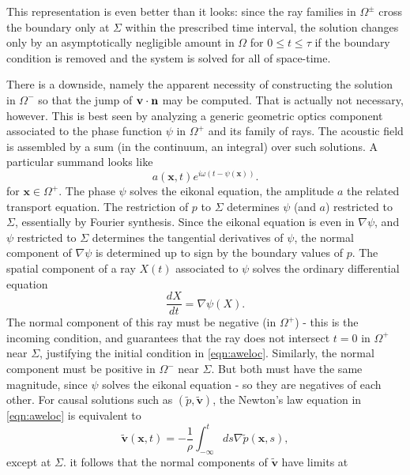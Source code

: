 \documentclass[georeport,12pt]{geophysics}
\newcommand{\bx}{\mathbf{x}}
\newcommand{\bv}{\mathbf{v}}
\begin{document}
This representation is even better than it looks: since the ray
families in $\Omega^{\pm}$ cross the boundary only at $\Sigma$ within
the prescribed time interval, the
solution changes only by an asymptotically negligible amount in
$\Omega$ for $0 \le t \le \tau$ if the boundary condition is removed
and the system is solved for all of space-time.

There is a downside, namely the apparent necessity of constructing the
solution in $\Omega^-$ so that the jump of $\bv \cdot {\bf n}$ may be
computed. That is actually not necessary, however.
This is best seen by analyzing a generic geometric optics
component associated to the phase function $\psi$ in $\Omega^+$ and its family of
rays. The acoustic field is assembled by a sum (in the continuum, an
integral) over such solutions. A particular summand looks like
\begin{equation}
  \label{eqn:go}
   a(\bx,t)e^{i\omega (t - \psi(\bx))}.
\end{equation}
for $\bx \in \Omega^+$.
The phase $\psi$ solves the eikonal equation, the amplitude $a$ the
related transport equation. The restriction of $p$
to $\Sigma$ determines $\psi$ (and $a$) restricted to $\Sigma$, essentially by
Fourier synthesis. Since the eikonal
equation is even in $\nabla \psi$,  and $\psi$ restricted to $\Sigma$
determines the tangential derivatives of $\psi$, the normal component
of $\nabla \psi$ is determined up to sign by the boundary values of
$p$. The spatial component of a ray $X(t)$ associated to $\psi$ solves
the ordinary differential equation
\begin{equation}
  \label{eqn:ray}
  \frac{dX}{dt} = \nabla \psi(X).
\end{equation}
The normal component of this ray must be negative (in
$\Omega^+$) - this is the incoming condition, and guarantees that the
ray does not intersect $t=0$ in $\Omega^+$ near $\Sigma$, justifying the initial
condition in \ref{eqn:aweloc}. Similarly, the normal component must be
positive in $\Omega^-$ near $\Sigma$. But both must have the same magnitude, since
$\psi$ solves the eikonal equation - so they are negatives of each
other. For causal solutions such as $(\tilde{p},\tilde{\bv})$, the
Newton's law equation in \ref{eqn:aweloc} is equivalent to
\begin{equation}\label{eqn:newt}
  \tilde{\bv}(\bx,t) = -\frac{1}{\rho}\int_{-\infty}^t ds \nabla \tilde{p}(\bx,s),
\end{equation}
except at $\Sigma$.
it follows that the normal components of $\tilde{\bv}$ have limits at
\end{document}
